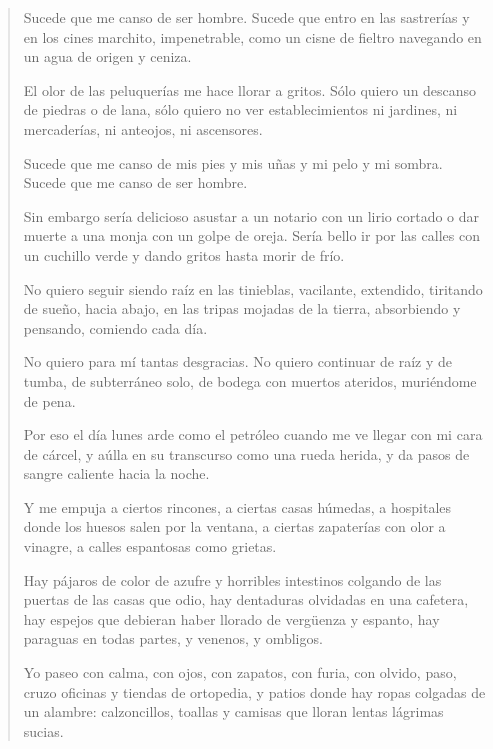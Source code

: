 \documentclass[12pt]{article}
\begin{document}
\clearpage
{}
\begin{verse}
Sucede que me canso de ser hombre.
Sucede que entro en las sastrerías y en los cines
marchito, impenetrable, como un cisne de fieltro
navegando en un agua de origen y ceniza.

El olor de las peluquerías me hace llorar a gritos.
Sólo quiero un descanso de piedras o de lana,
sólo quiero no ver establecimientos ni jardines,
ni mercaderías, ni anteojos, ni ascensores.

Sucede que me canso de mis pies y mis uñas
y mi pelo y mi sombra.
Sucede que me canso de ser hombre.

Sin embargo sería delicioso
asustar a un notario con un lirio cortado
o dar muerte a una monja con un golpe de oreja.
Sería bello
ir por las calles con un cuchillo verde
y dando gritos hasta morir de frío.

No quiero seguir siendo raíz en las tinieblas,
vacilante, extendido, tiritando de sueño,
hacia abajo, en las tripas mojadas de la tierra,
absorbiendo y pensando, comiendo cada día.

No quiero para mí tantas desgracias.
No quiero continuar de raíz y de tumba,
de subterráneo solo, de bodega con muertos
ateridos, muriéndome de pena.

Por eso el día lunes arde como el petróleo
cuando me ve llegar con mi cara de cárcel,
y aúlla en su transcurso como una rueda herida,
y da pasos de sangre caliente hacia la noche.

Y me empuja a ciertos rincones, a ciertas casas húmedas,
a hospitales donde los huesos salen por la ventana,
a ciertas zapaterías con olor a vinagre,
a calles espantosas como grietas.

Hay pájaros de color de azufre y horribles intestinos
colgando de las puertas de las casas que odio,
hay dentaduras olvidadas en una cafetera,
hay espejos
que debieran haber llorado de vergüenza y espanto,
hay paraguas en todas partes, y venenos, y ombligos.

Yo paseo con calma, con ojos, con zapatos,
con furia, con olvido,
paso, cruzo oficinas y tiendas de ortopedia,
y patios donde hay ropas colgadas de un alambre:
calzoncillos, toallas y camisas que lloran
lentas lágrimas sucias.

\end{verse}
\end{document}
